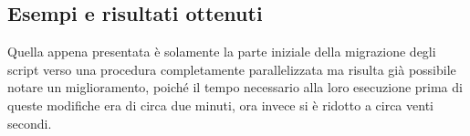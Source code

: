 \subsection{Esempi e risultati ottenuti}
\label{sub:esempi_risultati} Quella appena presentata è solamente la parte
iniziale della migrazione degli script verso una procedura completamente
parallelizzata ma risulta già possibile notare un miglioramento, poiché il tempo
necessario alla loro esecuzione prima di queste modifiche era di circa due minuti,
ora invece si è ridotto a circa venti secondi.